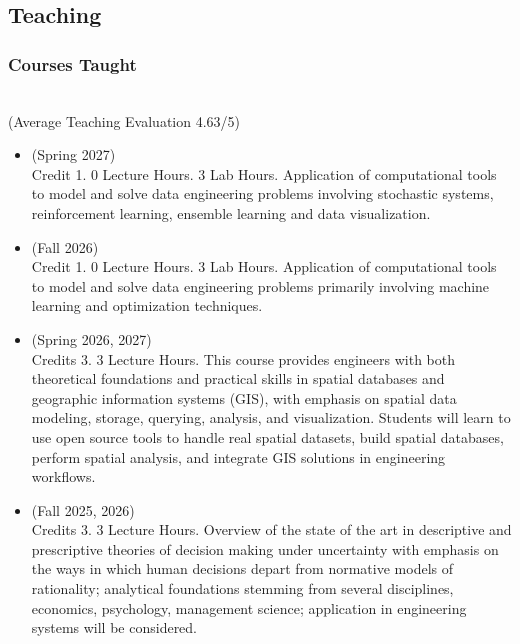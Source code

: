 \documentclass[11pt,oneside]{article}
\begin{document}
\subsection{Teaching}

\subsubsection{Courses Taught}
\hspace{40pt}{\frutigerregular Industrial and Systems Engineering, Texas A\&M University}\\
\hspace{40pt}({Average Teaching Evaluation 4.63/5})
\vspace{1pt}
\begin{itemize}[leftmargin=40pt, label={-}]
\item {} (Spring 2027)\\
      Credit 1. 0 Lecture Hours. 3 Lab Hours. Application of computational tools to model and solve data engineering problems involving stochastic systems, reinforcement learning, ensemble learning and data visualization.
\item {} (Fall 2026)\\
      Credit 1. 0 Lecture Hours. 3 Lab Hours. Application of computational tools to model and solve data engineering problems primarily involving machine learning and optimization techniques.
\item {} (Spring 2026, 2027)\\
      Credits 3. 3 Lecture Hours. This course provides engineers with both theoretical foundations and practical skills in spatial databases and geographic information systems (GIS), with emphasis on spatial data modeling, storage, querying, analysis, and visualization. Students will learn to use open source tools to handle real spatial datasets, build spatial databases, perform spatial analysis, and integrate GIS solutions in engineering workflows.
\item {} (Fall 2025, 2026)\\
      Credits 3. 3 Lecture Hours. Overview of the state of the art in descriptive and prescriptive theories of decision making under uncertainty with emphasis on the ways in which human decisions depart from normative models of rationality; analytical foundations stemming from several disciplines, economics, psychology, management science; application in engineering systems will be considered.

\end{itemize}
\end{document}
